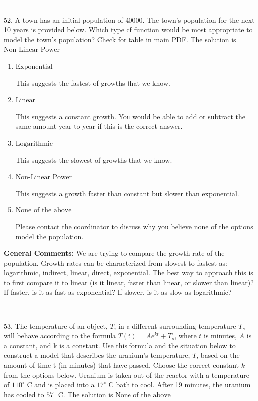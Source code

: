 \documentclass{extbook}[14pt]
\begin{document}
-----------------------------------------------

52. A town has an initial population of 40000. The town's population for the next 10 years is provided below. Which type of function would be most appropriate to model the town's population?
Check for table in main PDF. 
The solution is $ \text{Non-Linear Power} $ 

\begin{enumerate}[label=\Alph*.] 
\item $ \text{Exponential} $ 

 This suggests the fastest of growths that we know. 
\item $ \text{Linear} $ 

 This suggests a constant growth. You would be able to add or subtract the same amount year-to-year if this is the correct answer. 
\item $ \text{Logarithmic} $ 

 This suggests the slowest of growths that we know. 
\item $ \text{Non-Linear Power} $ 

 This suggests a growth faster than constant but slower than exponential. 
\item $ \text{None of the above} $ 

 Please contact the coordinator to discuss why you believe none of the options model the population. 
\end{enumerate} 
 
\textbf{General Comments:} We are trying to compare the growth rate of the population. Growth rates can be characterized from slowest to fastest as: logarithmic, indirect, linear, direct, exponential. The best way to approach this is to first compare it to linear (is it linear, faster than linear, or slower than linear)? If faster, is it as fast as exponential? If slower, is it as slow as logarithmic?

-----------------------------------------------

53. The temperature of an object, $T$, in a different surrounding temperature $T_s$ will behave according to the formula $T(t) = Ae^{kt} + T_s$, where $t$ is minutes, $A$ is a constant, and k is a constant. Use this formula and the situation below to construct a model that describes the uranium's temperature, $T$, based on the amount of time t (in minutes) that have passed. Choose the correct constant $k$ from the options below.
Uranium is taken out of the reactor with a temperature of $110^{\circ}$ C and is placed into a $17^{\circ}$ C bath to cool. After 19 minutes, the uranium has cooled to $57^{\circ}$ C. 
The solution is $ \text{None of the above} $ 
\end{document}
